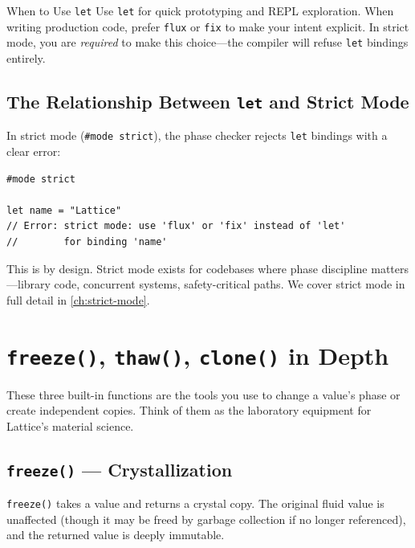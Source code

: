 \begin{tipbox}{When to Use \texttt{let}}
Use \lstinline|let| for quick prototyping and REPL exploration.
When writing production code, prefer \lstinline|flux| or \lstinline|fix| to make your intent explicit.
In strict mode, you are \emph{required} to make this choice---the compiler will refuse \lstinline|let| bindings entirely.
\end{tipbox}

\subsection{The Relationship Between \texttt{let} and Strict Mode}

In strict mode (\lstinline|#mode strict|), the phase checker rejects \lstinline|let| bindings with a clear error:

\begin{lstlisting}[language=Lattice, caption={\texttt{let} rejected in strict mode}]
#mode strict

let name = "Lattice"
// Error: strict mode: use 'flux' or 'fix' instead of 'let'
//        for binding 'name'
\end{lstlisting}

This is by design.
Strict mode exists for codebases where phase discipline matters---library code, concurrent systems, safety-critical paths.
We cover strict mode in full detail in \cref{ch:strict-mode}.


\section{\texttt{freeze()}, \texttt{thaw()}, \texttt{clone()} in Depth}\label{sec:freeze-thaw-clone}


These three built-in functions are the tools you use to change a value's phase or create independent copies.
Think of them as the laboratory equipment for Lattice's material science.

\subsection{\texttt{freeze()} --- Crystallization}\label{subsec:freeze}

\lstinline|freeze()| takes a value and returns a crystal copy.
The original fluid value is unaffected (though it may be freed by garbage collection if no longer referenced), and the returned value is deeply immutable.

